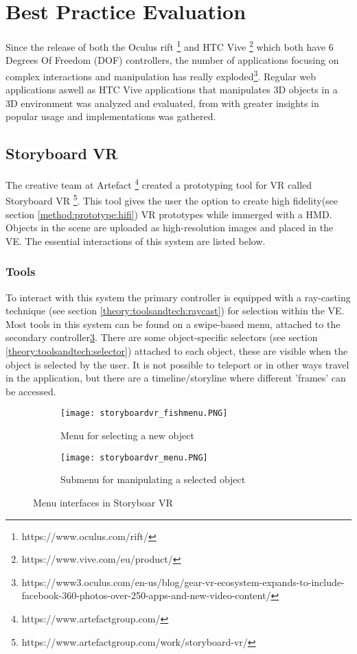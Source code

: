 \section{Best Practice Evaluation}
Since the release of both the Oculus rift \footnote{https://www.oculus.com/rift/} and HTC Vive \footnote{https://www.vive.com/eu/product/} which both have 6 Degrees Of Freedom (DOF) controllers, the number of applications focusing on complex interactions and manipulation has really exploded\footnote{https://www3.oculus.com/en-us/blog/gear-vr-ecosystem-expands-to-include-facebook-360-photos-over-250-apps-and-new-video-content/}. Regular web applications aswell as HTC Vive applications that manipulates 3D objects in a 3D environment was analyzed and evaluated, from with greater insights in popular usage and implementations was gathered.
\subsection{Storyboard VR}
The creative team at Artefact \footnote{https://www.artefactgroup.com/} created a prototyping tool for VR called Storyboard VR \footnote{https://www.artefactgroup.com/work/storyboard-vr/}. This tool gives the user the option to create high fidelity(see section \ref{method:prototype:hifi})  VR prototypes while immerged with a HMD. Objects in the scene are uploaded as high-resolution images and placed in the VE. The essential interactions of this system are listed below.
\subsubsection{Tools}
To interact with this system the primary controller is equipped with a ray-casting technique (see section \ref{theory:toolsandtech:raycast}) for selection within the VE.
Most tools in this system can be found on a swipe-based menu, attached to the secondary controller\ref{fig:storyboard}. There are some object-specific selectors (see section \ref{theory:toolsandtech:selector}) attached to each object, these are visible when the object is selected by the user. It is not possible to teleport or in other ways travel in the application, but there are  a timeline/storyline where different 'frames' can be accessed.

\begin{figure}
\begin{subfigure}{.5\textwidth}
  \centering
  \texttt{[image: storyboardvr\_fishmenu.PNG]}
  \caption{Menu for selecting a new object}
  \label{fig:storyboard:fishmenu}
\end{subfigure}%
\begin{subfigure}{.5\textwidth}
  \centering
  \texttt{[image: storyboardvr\_menu.PNG]}
  \caption{Submenu for manipulating a selected object}
  \label{fig:storyboard:menu}
\end{subfigure}
\caption{Menu interfaces in Storyboar VR}
\label{fig:storyboard}
\end{figure}

